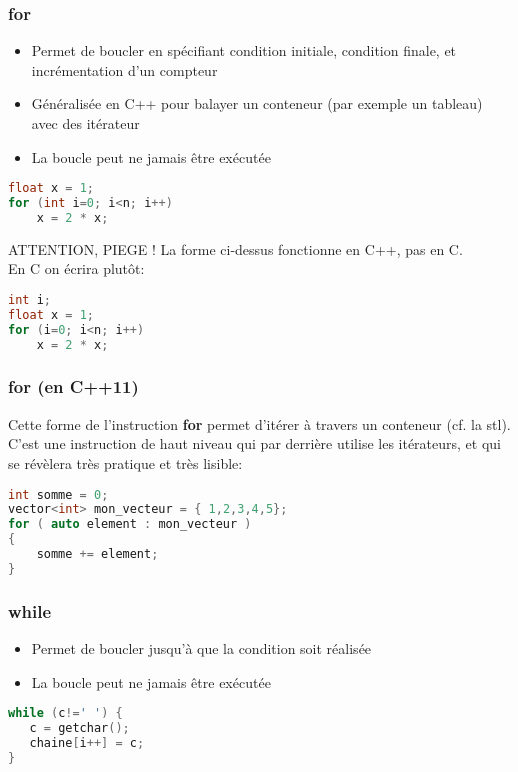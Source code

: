 \documentclass{beamer}
\begin{document}
\begin{frame}[fragile=singleslide,shrink=20]
\frametitle {for}
\begin{itemize}
\item{Permet de boucler en spécifiant condition initiale, condition finale, et incrémentation d'un compteur}
\item{Généralisée en C++ pour balayer un conteneur (par exemple un tableau) avec des itérateur}
\item{La boucle peut ne jamais être exécutée}
\end{itemize}
\begin{lstlisting}[language=c++]
float x = 1;
for (int i=0; i<n; i++)
    x = 2 * x;
\end{lstlisting}
\begin{block}{ATTENTION, PIEGE !}
La forme ci-dessus fonctionne en C++, pas en C. \\
En C on écrira plutôt:
\begin{lstlisting}[language=c++]
int i;
float x = 1;
for (i=0; i<n; i++)
    x = 2 * x;
\end{lstlisting}
\end{block}
\end{frame}

\begin{frame}[fragile=singleslide,shrink=20]
\frametitle {for (en C++11) }
Cette forme de l'instruction \textbf{for} permet d'itérer à travers un conteneur (cf. la stl). C'est une instruction de haut niveau
qui par derrière utilise les itérateurs, et qui se révèlera très pratique et très lisible:

\begin{lstlisting}[language=c++]
int somme = 0;
vector<int> mon_vecteur = { 1,2,3,4,5};
for ( auto element : mon_vecteur )
{
    somme += element;
}
\end{lstlisting}
\end{frame}

\begin{frame}[fragile=singleslide,shrink=20]
\frametitle {while}
\begin{itemize}
\item{Permet de boucler jusqu'à que la condition soit réalisée}
\item{La boucle peut ne jamais être exécutée}
\end{itemize}
\begin{lstlisting}[language=c++]
while (c!=' ') {
   c = getchar();
   chaine[i++] = c;
}
\end{lstlisting}
\end{frame}
\end{document}
